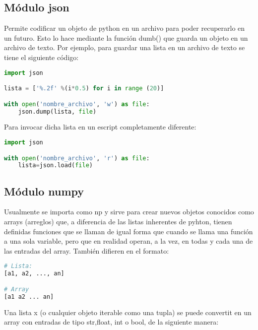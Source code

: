 \documentclass[10pt,oneside]{article}
\begin{document}
\begin{multicols}{2}
                \subsection{Módulo json}

                    Permite codificar un objeto de python en un archivo para poder recuperarlo en un futuro. Esto lo hace mediante la función dumb() que guarda un objeto en un archivo de texto. Por ejemplo, para guardar una lista en un archivo de texto se tiene el siguiente código: 

                    \begin{lstlisting}[language=Python]
import json

lista = ['%.2f' %(i*0.5) for i in range (20)]

with open('nombre_archivo', 'w') as file:  
    json.dump(lista, file)
                    \end{lstlisting}

                    Para invocar dicha lista en un escript completamente diferente:

                    \begin{lstlisting}[language=Python]
import json 

with open('nombre_archivo', 'r') as file:
    lista=json.load(file)
                    \end{lstlisting}
                    
                \subsection{Módulo numpy}

                    Usualmente se importa como np y sirve para crear nuevos objetos conocidos como arrays (arreglos) que, a diferencia de las listas inherentes de pyhton, tienen definidas funciones que se llaman de igual forma que cuando se llama una función a una sola variable, pero que en realidad operan, a la vez, en  todas y cada una de las entradas del array. También difieren en el formato:

                    \begin{lstlisting}[language=Python]
# Lista:
[a1, a2, ..., an]

# Array
[a1 a2 ... an]
                    \end{lstlisting}

                    Una lista x (o cualquier objeto iterable como una tupla) se puede convertit en un array con entradas de tipo str,float, int o bool, de la siguiente manera:


\end{multicols}
\end{document}

